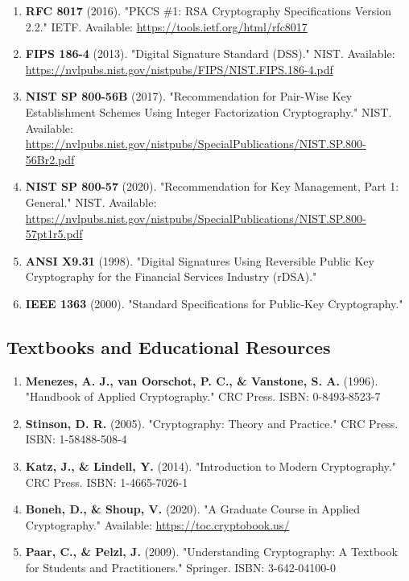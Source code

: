 \documentclass[11pt,a4paper]{article}
\begin{document}
\begin{enumerate}
    \item \textbf{RFC 8017} (2016). "PKCS \#1: RSA Cryptography Specifications Version 2.2." IETF. Available: \url{https://tools.ietf.org/html/rfc8017}
    
    \item \textbf{FIPS 186-4} (2013). "Digital Signature Standard (DSS)." NIST. Available: \url{https://nvlpubs.nist.gov/nistpubs/FIPS/NIST.FIPS.186-4.pdf}
    
    \item \textbf{NIST SP 800-56B} (2017). "Recommendation for Pair-Wise Key Establishment Schemes Using Integer Factorization Cryptography." NIST. Available: \url{https://nvlpubs.nist.gov/nistpubs/SpecialPublications/NIST.SP.800-56Br2.pdf}
    
    \item \textbf{NIST SP 800-57} (2020). "Recommendation for Key Management, Part 1: General." NIST. Available: \url{https://nvlpubs.nist.gov/nistpubs/SpecialPublications/NIST.SP.800-57pt1r5.pdf}
    
    \item \textbf{ANSI X9.31} (1998). "Digital Signatures Using Reversible Public Key Cryptography for the Financial Services Industry (rDSA)."
    
    \item \textbf{IEEE 1363} (2000). "Standard Specifications for Public-Key Cryptography."
\end{enumerate}

\subsection{Textbooks and Educational Resources}

\begin{enumerate}
    \item \textbf{Menezes, A. J., van Oorschot, P. C., \& Vanstone, S. A.} (1996). "Handbook of Applied Cryptography." CRC Press. ISBN: 0-8493-8523-7
    
    \item \textbf{Stinson, D. R.} (2005). "Cryptography: Theory and Practice." CRC Press. ISBN: 1-58488-508-4
    
    \item \textbf{Katz, J., \& Lindell, Y.} (2014). "Introduction to Modern Cryptography." CRC Press. ISBN: 1-4665-7026-1
    
    \item \textbf{Boneh, D., \& Shoup, V.} (2020). "A Graduate Course in Applied Cryptography." Available: \url{https://toc.cryptobook.us/}
    
    \item \textbf{Paar, C., \& Pelzl, J.} (2009). "Understanding Cryptography: A Textbook for Students and Practitioners." Springer. ISBN: 3-642-04100-0
\end{enumerate}
\end{document}
